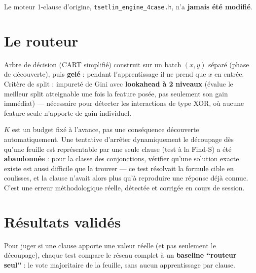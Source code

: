 \documentclass[12pt,a4paper]{article}
\theoremstyle{remark}
\begin{document}
Le moteur 1-clause d'origine, \texttt{tsetlin\_engine\_4case.h}, n'a
\textbf{jamais été modifié}.

\section{Le routeur}

Arbre de décision (CART simplifié) construit sur un batch $(x,y)$ séparé
(phase de découverte), puis \textbf{gelé} : pendant l'apprentissage il ne
prend que $x$ en entrée. Critère de split : impureté de Gini avec
\textbf{lookahead à 2 niveaux} (évalue le meilleur split atteignable une
fois la feature posée, pas seulement son gain immédiat) --- nécessaire pour
détecter les interactions de type XOR, où aucune feature seule n'apporte de
gain individuel.

$K$ est un budget fixé à l'avance, pas une conséquence découverte
automatiquement. Une tentative d'arrêter dynamiquement le découpage dès
qu'une feuille est représentable par une seule clause (test à la Find-S) a
été \textbf{abandonnée} : pour la classe des conjonctions, vérifier qu'une
solution exacte existe est aussi difficile que la trouver --- ce test
résolvait la formule cible en coulisses, et la clause n'avait alors plus
qu'à reproduire une réponse déjà connue. C'est une erreur méthodologique
réelle, détectée et corrigée en cours de session.

\section{Résultats validés}

Pour juger si une clause apporte une valeur réelle (et pas seulement le
découpage), chaque test compare le réseau complet à un \textbf{baseline
``routeur seul''} : le vote majoritaire de la feuille, sans aucun
apprentissage par clause.
\end{document}
